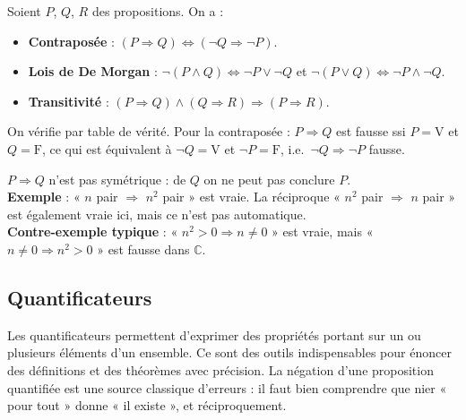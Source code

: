 \documentclass[11pt,a4paper,twoside]{book}
\newcommand{\C}{\mathbb{C}}
\begin{document}
\begin{propositionbox}
Soient $P$, $Q$, $R$ des propositions. On a :
\begin{itemize}
  \item \textbf{Contraposée} : $(P \Rightarrow Q) \Leftrightarrow (\neg Q \Rightarrow \neg P)$.
  \item \textbf{Lois de De Morgan} :
        $\neg(P \land Q) \Leftrightarrow \neg P \lor \neg Q$ \quad et \quad
        $\neg(P \lor Q) \Leftrightarrow \neg P \land \neg Q$.
  \item \textbf{Transitivité} : $(P \Rightarrow Q) \land (Q \Rightarrow R) \Rightarrow (P \Rightarrow R)$.
\end{itemize}
\end{propositionbox}

\begin{preuvebox}
On vérifie par table de vérité. Pour la contraposée : $P \Rightarrow Q$ est fausse ssi
$P = \text{V}$ et $Q = \text{F}$, ce qui est équivalent à $\neg Q = \text{V}$ et
$\neg P = \text{F}$, i.e.\ $\neg Q \Rightarrow \neg P$ fausse.
\end{preuvebox}

\begin{erreurbox}
$P \Rightarrow Q$ n'est pas symétrique : de $Q$ on ne peut pas conclure $P$.\\
\textbf{Exemple} : « $n$ pair $\Rightarrow$ $n^2$ pair » est vraie. La réciproque « $n^2$ pair
$\Rightarrow$ $n$ pair » est également vraie ici, mais ce n'est pas automatique.\\
\textbf{Contre-exemple typique} : « $n^2 > 0 \Rightarrow n \neq 0$ » est vraie, mais
« $n \neq 0 \Rightarrow n^2 > 0$ » est fausse dans $\C$.
\end{erreurbox}

\subsection{Quantificateurs}

Les quantificateurs permettent d'exprimer des propriétés portant sur un ou plusieurs éléments d'un ensemble. Ce sont des outils indispensables pour énoncer des définitions et des théorèmes avec précision. La négation d'une proposition quantifiée est une source classique d'erreurs : il faut bien comprendre que nier « pour tout » donne « il existe », et réciproquement.
\end{document}
